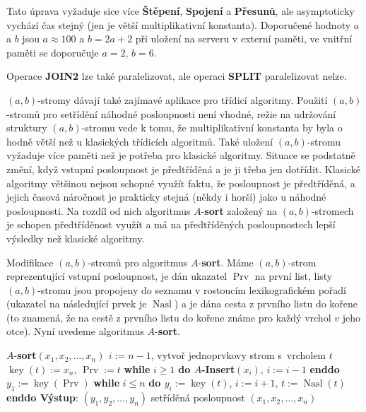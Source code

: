 \documentclass[a4paper,12pt]{article}
\DeclareMathOperator*{\Prv}{Prv}
\DeclareMathOperator*{\Nasl}{Nasl}
\DeclareMathOperator*{\key}{key}
\begin{document}
Tato úprava vyžaduje sice více {\bf Štěpení}, {\bf Spojení} a
{\bf Přesunů}, ale asymptoticky vychází čas stejný 
(jen je větší multiplikativní konstanta). Doporučené 
hodnoty $a$ a $b$ jsou $a\approx 100$ a $b=2a+2$ při uložení na serveru 
v externí paměti, ve vnitřní paměti 
se doporučuje $a=2$, $b=6$.

Operace {\bf JOIN2} lze také paralelizovat, ale operaci {\bf SPLIT  }
paralelizovat nelze.

$(a,b)$-stromy dávají také zajímavé aplikace pro 
třídicí 
algoritmy. Použití $(a,b)$-stromů pro setřídění 
náhodné posloupnosti není vhodné, režie na udržování 
struktury $(a,b)$-stromu vede k tomu, že multiplikativní 
konstanta by byla o hodně větší než u klasických 
třídicích algoritmů. Také uložení $(
a,b)$-stromu 
vyžaduje více paměti než je potřeba pro klasické 
algoritmy. Situace se podstatně změní, když vstupní 
posloupnost je před\-tří\-děná a je ji třeba jen dotřídit. 
Klasické algoritmy většinou nejsou schopné využít faktu, že 
posloupnost je předtříděná, a jejich časová náročnost je 
prakticky stejná (někdy i horší) jako u náhodné 
posloupnosti. Na rozdíl od nich algoritmus $A$-{\bf sort }
založený na $(a,b)$-stromech je schopen předtříděnost 
využít a má na předtříděných posloupnostech lepší 
výsledky než klasické algoritmy.

Modifikace $(a,b)$-stromů pro algoritmus 
$A$-{\bf sort}. Máme $(a,b)$-strom reprezentující vstupní 
posloupnost, je dán ukazatel $\Prv$ na první list, listy 
$(a,b)$-stromu jsou propojeny do seznamu v rostoucím 
lexikografickém pořadí (ukazatel na následující prvek je 
$\Nasl$) a je dána cesta z prvního listu do kořene (to 
znamená, že na cestě z prvního listu do kořene známe 
pro každý vrchol $v$ jeho otce). Nyní uvedeme algoritmus 
$A$-{\bf sort}. 

$A$-{\bf sort$(x_1,x_2,\dots,x_n)$\newline 
$i:=n-1$}, vytvoř jednoprvkovy strom s~vrcholem $t$\newline 
$\key(t):=x_n$, $\Prv:=t$\newline 
{\bf while} $i\ge 1$ {\bf do $A$-Insert$(x_i)$}, $i:=i-1$ {\bf enddo}\newline 
$y_1:=\key(\Prv)$\newline 
{\bf while} $i\le n$ {\bf do\newline 
\phantom{---}$y_i:=\key(t)$}, $i:=i+1$, $t:=\Nasl(t)$\newline 
{\bf enddo\newline 
Výstup}: $(y_1,y_2,\dots,y_n)$ setříděná posloupnost $
(x_1,x_2,\dots,x_n)$
\end{document}
